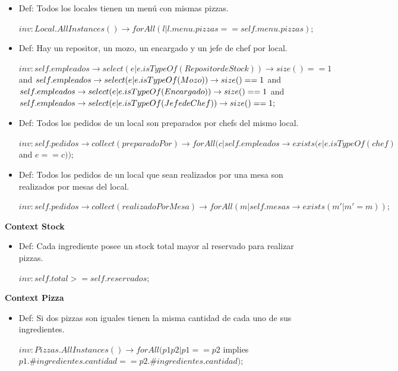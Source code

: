 \documentclass[a4paper,11pt] {article}
\begin{document}
\begin{itemize}
	\item Def: Todos los locales tienen un men\'u con mismas pizzas.
	
				$inv: Local.AllInstances()\rightarrow forAll(l | l.menu.pizzas == self.menu.pizzas);$
				
	\item	Def: Hay un repositor, un mozo, un encargado y un jefe de chef por local.
	
	$inv: self.empleados\rightarrow select(e | e.isTypeOf(Repositor de Stock))\rightarrow size() == 1 $ and $ \\
	self.empleados\rightarrow select(e | e.isTypeOf(Mozo))\rightarrow size() == 1 $ and $	\\
	self.empleados\rightarrow select(e | e.isTypeOf(Encargado))\rightarrow size() == 1 $ and $	\\
	self.empleados\rightarrow select(e | e.isTypeOf(Jefe de Chef))\rightarrow size() == 1;$	\\
	
	\item	Def: Todos los pedidos de un local son preparados por chefs del mismo local.
	
	$inv: self.pedidos\rightarrow collect(preparadoPor)\rightarrow forAll(c | self.empleados \rightarrow exists(e | e.isTypeOf(chef) $ and $e == c));$
	
	\item	Def: Todos los pedidos de un local que sean realizados por una mesa son realizados por mesas del local.
	
	$inv: self.pedidos\rightarrow collect(realizadoPorMesa)\rightarrow forAll(m | self.mesas\rightarrow exists(m' | m' = m));$
	
\end{itemize}

\textbf{Context Stock}

\begin{itemize}
	\item Def: Cada ingrediente posee un stock total mayor al reservado para realizar pizzas.
	
	$inv: self.total >= self.reservados;$
\end{itemize}

\textbf{Context Pizza}

\begin{itemize}
	\item Def: Si dos pizzas son iguales tienen la misma cantidad de cada uno de sus ingredientes.
	
	$inv: Pizzas.AllInstances()\rightarrow forAll(p1 p2 | p1 == p2 $ implies $ p1.\#ingredientes.cantidad == p2.\#ingredientes.cantidad);$
\end{itemize}
\end{document}
